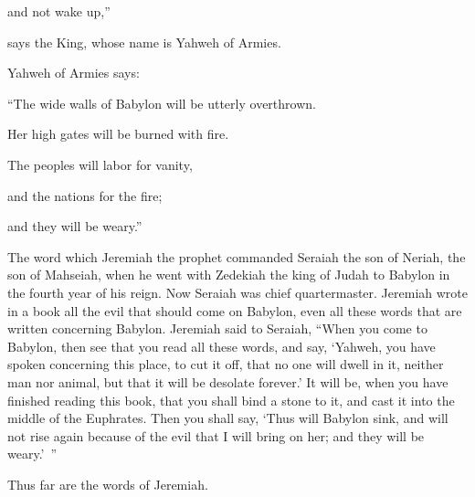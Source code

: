 {\par }{\QB and not wake up,”
\par }{\QB says the King, whose name is Yahweh of Armies.
\par }{\PP {}Yahweh of Armies says:
\par }{\Q “The wide walls of Babylon will be utterly overthrown.
\par }{\QB Her high gates will be burned with fire.
\par }{\Q The peoples will labor for vanity,
\par }{\QB and the nations for the fire;
\par }{\QB and they will be weary.”
\par }{\PP {}The word which Jeremiah the prophet commanded Seraiah the son of Neriah, the son of Mahseiah, when he went with Zedekiah the king of Judah to Babylon in the fourth year of his reign. Now Seraiah was chief quartermaster.
Jeremiah wrote in a book all the evil that should come on Babylon, even all these words that are written concerning Babylon.
Jeremiah said to Seraiah, “When you come to Babylon, then see that you read all these words,
and say, ‘Yahweh, you have spoken concerning this place, to cut it off, that no one will dwell in it, neither man nor animal, but that it will be desolate forever.’
It will be, when you have finished reading this book, that you shall bind a stone to it, and cast it into the middle of the Euphrates.
Then you shall say, ‘Thus will Babylon sink, and will not rise again because of the evil that I will bring on her; and they will be weary.’ ”
\par }{\PP Thus far are the words of Jeremiah.

}
